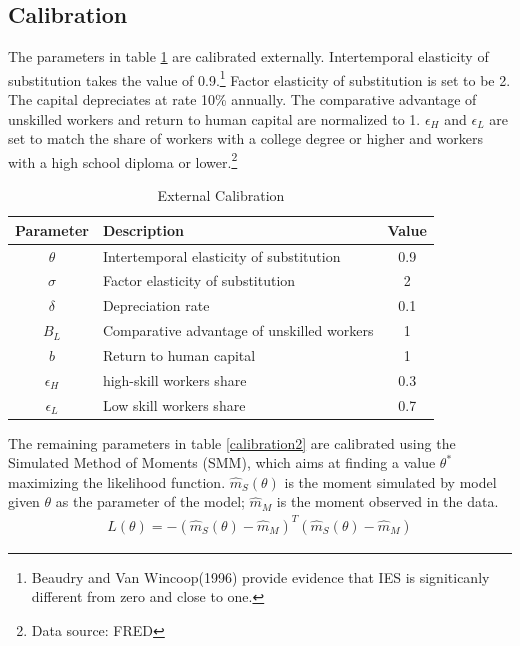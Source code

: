 \documentclass[12pt]{article}
\begin{document}
\subsection{Calibration}
The parameters in table \ref{calibration1} are calibrated externally. Intertemporal elasticity of substitution takes the value of 0.9.\footnote{Beaudry and Van Wincoop(1996)\nocite{BeaudryVanWincoop1996} provide evidence that IES is signiticanly different from zero and close to one.} Factor elasticity of substitution is set to be 2. The capital depreciates at rate 10\% annually. The comparative advantage of unskilled workers and return to human capital are normalized to 1. $\epsilon_H$ and $\epsilon_L$ are set to match the share of workers with a college degree or higher and workers with a high school diploma or lower.\footnote{Data source: FRED} 
\begin{table}[h!]
\center
\begin{tabular}{clc}
\hline \hline
Parameter & Description      & Value   \\ \hline 
$\theta$    & Intertemporal elasticity of substitution        &  0.9    \\
$\sigma$    & Factor elasticity of substitution        &  2    \\
$\delta$    & Depreciation rate       &  0.1    \\
$B_L$ & Comparative advantage of unskilled workers   &     1  \\
$b$ & Return to human capital   &     1  \\
$\epsilon_H$    & high-skill workers share   &  0.3    \\
$\epsilon_L$     & Low skill workers share     &  0.7  \\
\hline
\end{tabular}
\caption{External Calibration}
\label{calibration1}
\end{table}

The remaining parameters in table \ref{calibration2} are calibrated using the Simulated Method of Moments (SMM), which aims at finding a value $\theta^*$ maximizing the likelihood function. $\hat{m}_S(\theta)$ is the moment simulated by model given $\theta$ as the parameter of the model; $\hat{m}_M$ is the moment observed in the data.
\begin{align*}
L(\theta) = -(\hat{m}_S(\theta)-\hat{m}_M)^T(\hat{m}_S(\theta)-\hat{m}_M)
\end{align*}
\end{document}
